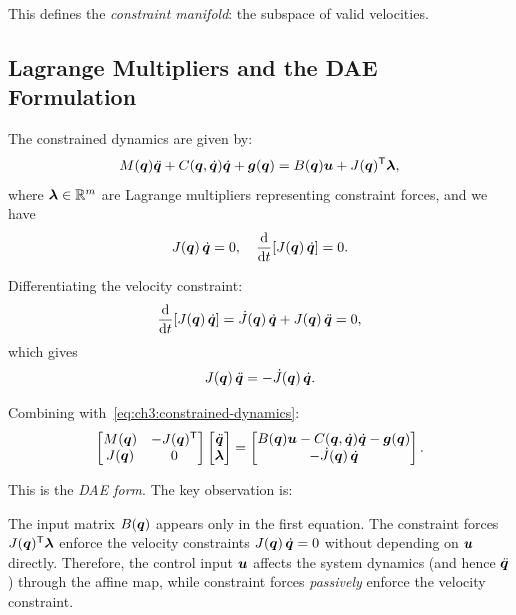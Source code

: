 This defines the \emph{constraint manifold}: the subspace of valid velocities.

\subsection{Lagrange Multipliers and the DAE Formulation}

The constrained dynamics are given by:
\begin{equation}
M(\bm{q})\ddot{\bm{q}} + C(\bm{q},\dot{\bm{q}})\dot{\bm{q}} + \bm{g}(\bm{q}) = B(\bm{q})\bm{u} + J(\bm{q})^{\mathsf{T}}\bm{\lambda},
\label{eq:ch3:constrained-dynamics}
\end{equation}
where $\bm{\lambda} \in \mathbb{R}^m$ are Lagrange multipliers representing constraint forces, and we
have
\begin{equation}
J(\bm{q})\,\dot{\bm{q}} = 0, \quad \frac{\mathrm{d}}{\mathrm{d} t}[J(\bm{q})\,\dot{\bm{q}}] = 0.
\label{eq:ch3:constraint-equations}
\end{equation}

Differentiating the velocity constraint:
\begin{equation}
\frac{\mathrm{d}}{\mathrm{d} t}[J(\bm{q})\,\dot{\bm{q}}] = \dot J(\bm{q})\,\dot{\bm{q}} + J(\bm{q})\,\ddot{\bm{q}} = 0,
\end{equation}
which gives
\begin{equation}
J(\bm{q})\,\ddot{\bm{q}} = -\dot J(\bm{q})\,\dot{\bm{q}}.
\label{eq:ch3:constraint-acceleration}
\end{equation}

Combining with~\eqref{eq:ch3:constrained-dynamics}:
\begin{equation}
\begin{bmatrix} M(\bm{q}) & -J(\bm{q})^{\mathsf{T}} \\ J(\bm{q}) & 0 \end{bmatrix}
\begin{bmatrix} \ddot{\bm{q}} \\ \bm{\lambda} \end{bmatrix}
= \begin{bmatrix} B(\bm{q})\bm{u} - C(\bm{q},\dot{\bm{q}})\dot{\bm{q}} - \bm{g}(\bm{q}) \\ -\dot J(\bm{q})\,\dot{\bm{q}} \end{bmatrix}.
\label{eq:ch3:DAE-system}
\end{equation}

This is the \emph{DAE form}. The key observation is:

\begin{proposition}
The input matrix $B(\bm{q})$ appears only in the first equation. The constraint forces $J(\bm{q})^{\mathsf{T}}\bm{\lambda}$
enforce the velocity constraints $J(\bm{q})\,\dot{\bm{q}} = 0$ without depending on $\bm{u}$ directly.
Therefore, the control input $\bm{u}$ affects the system dynamics (and hence $\ddot{\bm{q}}$)
through the affine map, while constraint forces \emph{passively} enforce the velocity constraint.
\end{proposition}

